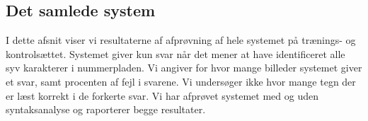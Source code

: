 


 %







\subsection{Det samlede system}
\label{sec:test:samlet_system}
I dette afsnit viser vi resultaterne af afprøvning af hele systemet på trænings- og kontrolsættet. Systemet giver kun svar når det mener at have identificeret alle syv karakterer i nummerpladen. Vi angiver for hvor mange billeder systemet giver et svar, samt procenten af fejl i svarene. Vi undersøger ikke hvor mange tegn der er læst korrekt i de forkerte svar. Vi har afprøvet systemet med og uden syntaksanalyse og raporterer begge resultater.

